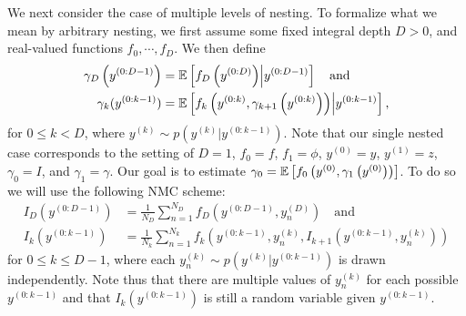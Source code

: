 %
%
%

We next consider the case of multiple levels of nesting.
To formalize what we mean by arbitrary nesting, we first assume some fixed integral depth
$D > 0$, and real-valued functions $f_0, \cdots, f_D$.
We then define
\begin{align*}
  \gamma_D\left(y^{(0:D-1)}\right) &= \mathbb{E} \left[f_D\left(y^{(0:D)}\right) \middle| y^{(0:D-1)}\right] \quad \text{and} \\
  \gamma_k(y^{(0:k-1)}) &= \mathbb{E} \left[f_k\left(y^{(0:k)}, \gamma_{k+1}\left(y^{(0:k)}\right)\right) \middle| y^{(0:k-1)}\right],
\end{align*}
for $0 \leq k < D$, where $y^{(k)} \sim p\left(y^{(k)}|y^{(0:k-1)}\right)$. 
Note that our single nested case corresponds to the setting of $D=1$, $f_0 = f$, $f_1 = \phi$, $y^{(0)}=y$,
$y^{(1)}=z$, $\gamma_0 = I$, and $\gamma_1 = \gamma$. Our goal is to
estimate $\gamma_0 = \mathbb{E} \left[f_0\left(y^{(0)},
\gamma_1\left(y^{(0)}\right)\right)\right]$. To do so we will use the following NMC scheme:
\begin{align*}
  I_D\left(y^{(0:D-1)}\right) &= \frac{1}{N_D} \sum_{n=1}^{N_D} f_D\left(y^{(0:D-1)}, y^{(D)}_n\right) \quad \text{and} \\
  I_k\left(y^{(0:k-1)}\right) &= \frac{1}{N_k} \sum_{n=1}^{N_k} f_k\left(y^{(0:k-1)}, y^{(k)}_n, I_{k+1}\left(y^{(0:k-1)}, y^{(k)}_n\right)\right)
\end{align*}
for $0 \leq k \le D-1$, where each $y^{(k)}_n \sim p\left(y^{(k)}|y^{(0:k-1)}\right)$ is drawn
independently. Note thus that there are multiple values of $y^{(k)}_n$ for each possible $y^{(0:k-1)}$
and that $I_k\left(y^{(0:k-1)}\right)$ is still a random variable given  $y^{(0:k-1)}$.

